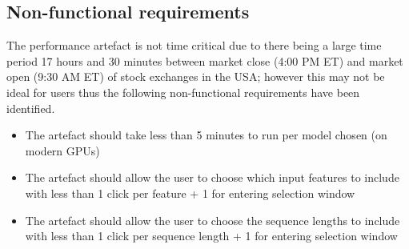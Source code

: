 \subsection{Non-functional requirements}
The performance artefact is not time critical due to there being a large time period 17 hours and 30 minutes
between market close (4:00 PM ET) and market open (9:30 AM ET) of stock exchanges in the USA; however this
may not be ideal for users thus the following non-functional requirements have been identified.
\begin{itemize}
    \item The artefact should take less than 5 minutes to run per model chosen (on modern GPUs)
    \item The artefact should allow the user to choose which input features to include
    with less than 1 click per feature + 1 for entering selection window
    \item The artefact should allow the user to choose the sequence lengths to include
    with less than 1 click per sequence length + 1 for entering selection window
\end{itemize}
